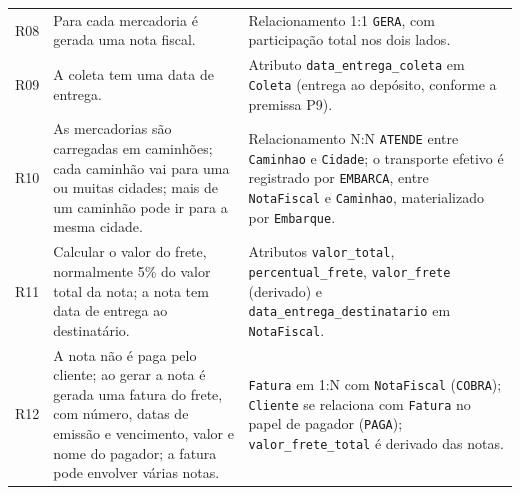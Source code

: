 {\begin{longtable}{@{}L{1.0cm}L{4.6cm}L{9.4cm}@{}}
R08 & Para cada mercadoria é gerada uma nota fiscal. & Relacionamento 1:1 \texttt{GERA}, com participação total nos dois lados.\\

R09 & A coleta tem uma data de entrega. & Atributo \texttt{data\_entrega\_coleta} em \texttt{Coleta} (entrega ao depósito, conforme a premissa P9).\\

R10 & As mercadorias são carregadas em caminhões; cada caminhão vai para uma ou muitas cidades; mais de um caminhão pode ir para a mesma cidade. & Relacionamento N:N \texttt{ATENDE} entre \texttt{Caminhao} e \texttt{Cidade}; o transporte efetivo é registrado por \texttt{EMBARCA}, entre \texttt{NotaFiscal} e \texttt{Caminhao}, materializado por \texttt{Embarque}.\\

R11 & Calcular o valor do frete, normalmente 5\% do valor total da nota; a nota tem data de entrega ao destinatário. & Atributos \texttt{valor\_total}, \texttt{percentual\_frete}, \texttt{valor\_frete} (derivado) e \texttt{data\_entrega\_destinatario} em \texttt{NotaFiscal}.\\

R12 & A nota não é paga pelo cliente; ao gerar a nota é gerada uma fatura do frete, com número, datas de emissão e vencimento, valor e nome do pagador; a fatura pode envolver várias notas. & \texttt{Fatura} em 1:N com \texttt{NotaFiscal} (\texttt{COBRA}); \texttt{Cliente} se relaciona com \texttt{Fatura} no papel de pagador (\texttt{PAGA}); \texttt{valor\_frete\_total} é derivado das notas.\\
\end{longtable}
}
